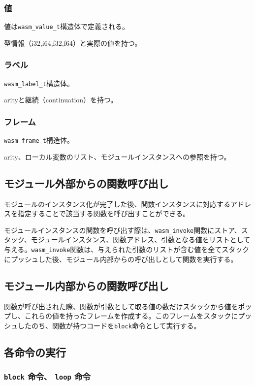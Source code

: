 \subsubsection{値}
値は\verb|wasm_value_t|構造体で定義される。

型情報（i32,i64,f32,f64）と実際の値を持つ。

\subsubsection{ラベル}
\verb|wasm_label_t|構造体。

arityと継続（continuation）を持つ。

\subsubsection{フレーム}
\verb|wasm_frame_t|構造体。

arity、ローカル変数のリスト、モジュールインスタンスへの参照を持つ。

\subsection{モジュール外部からの関数呼び出し}

モジュールのインスタンス化が完了した後、関数インスタンスに対応するアドレスを指定することで該当する関数を呼び出すことができる。

モジュールインスタンスの関数を呼び出す際は、\verb|wasm_invoke|関数にストア、スタック、モジュールインスタンス、関数アドレス、引数となる値をリストとして与える。\verb|wasm_invoke|関数は、与えられた引数のリストが含む値を全てスタックにプッシュした後、モジュール内部からの呼び出しとして関数を実行する。

\subsection{モジュール内部からの関数呼び出し}

関数が呼び出された際、関数が引数として取る値の数だけスタックから値をポップし、これらの値を持ったフレームを作成する。このフレームをスタックにプッシュしたのち、関数が持つコードを\verb|block|命令として実行する。

\subsection{各命令の実行}

\subsubsection{{\tt block} 命令、 {\tt loop} 命令}

